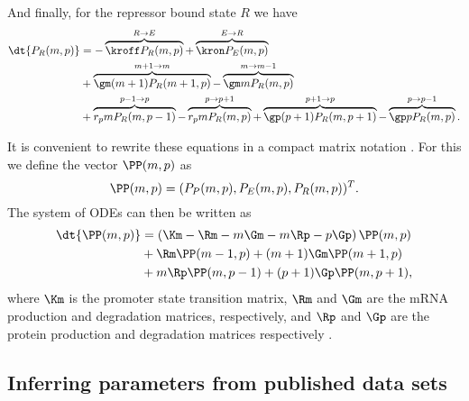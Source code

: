 And finally, for the repressor bound state $R$ we have
\begin{equation}
  \begin{aligned}
    \dt{P_R(m, p)} &=
    - \overbrace{\kroff P_R(m, p)}^{R \rightarrow E} %
    + \overbrace{\kron P_E(m, p)}^{E \rightarrow R}\\ %
    &+ \overbrace{\gm (m + 1) P_R(m+1 , p)}^{m+1 \rightarrow m} %
    - \overbrace{\gm m P_R(m , p)}^{m \rightarrow m-1}\\ %
    &+ \overbrace{r_p m P_R(m, p - 1)}^{p-1 \rightarrow p} %
    - \overbrace{r_p m P_R(m, p)}^{p \rightarrow p+1} %
    + \overbrace{\gp (p + 1) P_R(m, p + 1)}^{p + 1 \rightarrow p} %
    - \overbrace{\gp p P_R(m, p)}^{p \rightarrow p-1}. %
  \end{aligned}
\end{equation}

It is convenient to rewrite these equations in a compact matrix notation
\cite{Sanchez2013}. For this we define the vector $\PP(m, p)$ as
\begin{equation}
  \PP(m, p) = (P_P(m, p), P_E(m, p), P_R(m, p))^T.
\end{equation}
The system of ODEs can then be written as
\begin{equation}
  \begin{aligned}
    \dt{\PP(m, p)} &= \left( \Km -\Rm -m\Gm -m\Rp -p\Gp \right) \PP(m, p)\\
    &+ \Rm \PP(m-1, p)
    + (m + 1) \Gm \PP(m + 1, p)\\
    &+ m \Rp \PP(m, p - 1)
    + (p + 1) \Gp \PP(m, p + 1),
  \end{aligned}
  \label{eq_cme_matrix}
\end{equation}
where $\Km$ is the promoter state transition matrix, $\Rm$ and $\Gm$ are the
mRNA production and degradation matrices, respectively, and $\Rp$ and $\Gp$ are
the protein production and degradation matrices respectively .

\subsection{Inferring parameters from published data sets}

